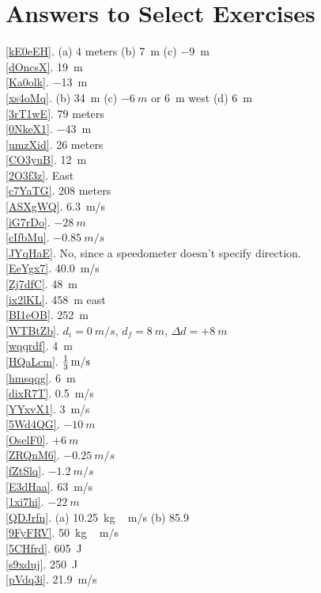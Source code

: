 \documentclass{article}
\begin{document}
\clearpage
\section{Answers to Select Exercises}

\ref{kE0eEH}. (a) 4 meters \hspace{1em} (b) \SI{+7}{m} \hspace{1em} (c) \SI{-9}{m}\\
\ref{dOncsX}. \SI{19}{m}\\
\ref{Ka0olk}. \SI{-13}{m}\\
\ref{xs4oMq}. (b) \SI{34}{m} \hspace{2em} (c) $-\SI{6}{m}$ or \SI{6}{m} west \hspace{2em} (d) \SI{6}{m}\\ 
\ref{3rT1wE}. 79 meters\\
\ref{0NkeX1}. \SI{-43}{m}\\
\ref{umzXid}. 26 meters\\
\ref{CO3yuB}. \SI{12}{m}\\
\ref{2O3f3z}. East\\
\ref{c7YaTG}. 208 meters\\
\ref{ASXgWQ}. \SI{6.3}{m/s}\\
\ref{iG7rDo}. $-\SI{28}{m}$\\
\ref{cIfbMu}. $-\SI{0.85}{m/s}$\\
\ref{JYqHaE}. No, since a speedometer doesn't specify direction.\\
\ref{EeYgx7}. \SI{40.0}{m/s}\\
\ref{Zj7dfC}. \SI{48}{m}\\
\ref{ix2lKL}. \SI{458}{m} east\\
\ref{BI1eOB}. \SI{252}{m}\\
\ref{WTBtZb}. $d_i=\SI{0}{m/s}$, $d_f=\SI{8}{m}$, $\Delta{d} = +\SI{8}{m}$\\
\ref{wqqrdf}. \SI{4}{m}\\
\ref{HQaLcm}. $\SI[parse-numbers = false]{\frac{1}{3}}{m/s}$\\
\ref{hmsqqg}. \SI{6}{m}\\
\ref{dixR7T}. \SI{0.5}{m/s}\\
\ref{YYxvX1}. \SI{3}{m/s}\\
\ref{5Wd4QG}. $-\SI{10}{m}$\\
\ref{OselF0}. $+\SI{6}{m}$\\
\ref{ZRQnM6}. $-\SI{0.25}{m/s}$\\
\ref{fZtSlq}. $-\SI{1.2}{m/s}$\\
\ref{E3dHaa}. \SI{63}{m/s}\\
\ref{1xi7hi}. $-\SI{22}{m}$\\
\ref{QDJrfn}. (a) \SI{10.25}{kg\,m/s} \hspace{1em} (b) 85.9\\
\ref{9FyFRV}. \SI{50}{kg\,m/s}\\
\ref{5CHfrd}. \SI{605}{J}\\
\ref{s9xduj}. \SI{250}{J}\\
\ref{pVdq3i}. \SI{21.9}{m/s}
\end{document}
